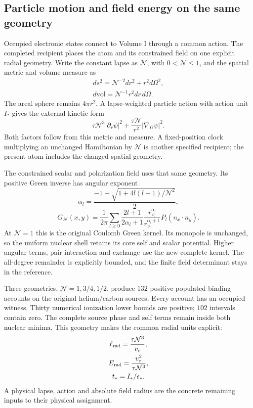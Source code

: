 
\subsection{Particle motion and field energy on the same geometry}

Occupied electronic states connect to Volume I through a common action. The completed recipient places the atom and its constrained field on one explicit radial geometry. Write the constant lapse as $\mathcal N$, with $0<\mathcal N\leq1$, and the spatial metric and volume measure as
\[
\begin{gathered}
ds^2=\mathcal N^{-2}dr^2+r^2d\Omega^2,
 \\
 d\mathrm{vol}=\mathcal N^{-1}r^2dr\,d\Omega.
\end{gathered}
\]
The areal sphere remains $4\pi r^2$. A lapse-weighted particle action with action unit $I_*$ gives the external kinetic form
\[
 \tau\mathcal N^3|\partial_r\psi|^2
       +\frac{\tau\mathcal N}{r^2}|\nabla_\Omega\psi|^2.
\]
Both factors follow from this metric and measure. A fixed-position clock multiplying an unchanged Hamiltonian by $\mathcal N$ is another specified recipient; the present atom includes the changed spatial geometry. 

The constrained scalar and polarization field uses that same geometry. Its positive Green inverse has angular exponent
\[
 \alpha_l=\frac{-1+\sqrt{1+4l(l+1)/\mathcal N^2}}2,
\]
\[
 G_{\mathcal N}(x,y)=\frac1{2\pi}
  \sum_{l\geq0}\frac{2l+1}{2\alpha_l+1}
  \frac{r_<^{\alpha_l}}{r_>^{\alpha_l+1}}P_l(n_x\cdot n_y).
\]
At $\mathcal N=1$ this is the original Coulomb Green kernel. Its monopole is unchanged, so the uniform nuclear shell retains its core self and scalar potential. Higher angular terms, pair interaction and exchange use the new complete kernel. The all-degree remainder is explicitly bounded, and the finite field determinant stays in the reference.

Three geometries, $\mathcal N=1,3/4,1/2$, produce $132$ positive populated binding accounts on the original helium/carbon sources. Every account has an occupied witness. Thirty numerical ionization lower bounds are positive; $102$ intervals contain zero. The complete source phase and self terms remain inside both nuclear minima. This geometry makes the common radial units explicit:
\[
\begin{gathered}
\ell_{\rm rad}=\frac{\tau\mathcal N^3}{v_c},\\
 E_{\rm rad}=\frac{v_c^2}{\tau\mathcal N^3},\\
 t_*=I_*/\epsilon_*.
\end{gathered}
\]
A physical lapse, action and absolute field radius are the concrete remaining inputs to their physical assignment.

